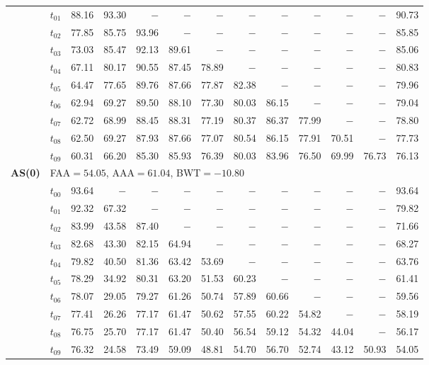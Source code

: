 \begin{table}[ht]
\begin{tabular}{@{}l l r r r r r r r r r r r@{}}
 & $t_{01}$ & 88.16 & 93.30 & $-$ & $-$ & $-$ & $-$ & $-$ & $-$ & $-$ & $-$ & 90.73 \\
 & $t_{02}$ & 77.85 & 85.75 & 93.96 & $-$ & $-$ & $-$ & $-$ & $-$ & $-$ & $-$ & 85.85 \\
 & $t_{03}$ & 73.03 & 85.47 & 92.13 & 89.61 & $-$ & $-$ & $-$ & $-$ & $-$ & $-$ & 85.06 \\
 & $t_{04}$ & 67.11 & 80.17 & 90.55 & 87.45 & 78.89 & $-$ & $-$ & $-$ & $-$ & $-$ & 80.83 \\
 & $t_{05}$ & 64.47 & 77.65 & 89.76 & 87.66 & 77.87 & 82.38 & $-$ & $-$ & $-$ & $-$ & 79.96 \\
 & $t_{06}$ & 62.94 & 69.27 & 89.50 & 88.10 & 77.30 & 80.03 & 86.15 & $-$ & $-$ & $-$ & 79.04 \\
 & $t_{07}$ & 62.72 & 68.99 & 88.45 & 88.31 & 77.19 & 80.37 & 86.37 & 77.99 & $-$ & $-$ & 78.80 \\
 & $t_{08}$ & 62.50 & 69.27 & 87.93 & 87.66 & 77.07 & 80.54 & 86.15 & 77.91 & 70.51 & $-$ & 77.73 \\
 & $t_{09}$ & 60.31 & 66.20 & 85.30 & 85.93 & 76.39 & 80.03 & 83.96 & 76.50 & 69.99 & 76.73 & 76.13 \\
\midrule
\multirow{11}{*}{\textbf{AS(0)}} & \multicolumn{12}{l}{\quad\small FAA$=54.05$,\; AAA$=61.04$,\; BWT$=-10.80$} \\
 & $t_{00}$ & 93.64 & $-$ & $-$ & $-$ & $-$ & $-$ & $-$ & $-$ & $-$ & $-$ & 93.64 \\
 & $t_{01}$ & 92.32 & 67.32 & $-$ & $-$ & $-$ & $-$ & $-$ & $-$ & $-$ & $-$ & 79.82 \\
 & $t_{02}$ & 83.99 & 43.58 & 87.40 & $-$ & $-$ & $-$ & $-$ & $-$ & $-$ & $-$ & 71.66 \\
 & $t_{03}$ & 82.68 & 43.30 & 82.15 & 64.94 & $-$ & $-$ & $-$ & $-$ & $-$ & $-$ & 68.27 \\
 & $t_{04}$ & 79.82 & 40.50 & 81.36 & 63.42 & 53.69 & $-$ & $-$ & $-$ & $-$ & $-$ & 63.76 \\
 & $t_{05}$ & 78.29 & 34.92 & 80.31 & 63.20 & 51.53 & 60.23 & $-$ & $-$ & $-$ & $-$ & 61.41 \\
 & $t_{06}$ & 78.07 & 29.05 & 79.27 & 61.26 & 50.74 & 57.89 & 60.66 & $-$ & $-$ & $-$ & 59.56 \\
 & $t_{07}$ & 77.41 & 26.26 & 77.17 & 61.47 & 50.62 & 57.55 & 60.22 & 54.82 & $-$ & $-$ & 58.19 \\
 & $t_{08}$ & 76.75 & 25.70 & 77.17 & 61.47 & 50.40 & 56.54 & 59.12 & 54.32 & 44.04 & $-$ & 56.17 \\
 & $t_{09}$ & 76.32 & 24.58 & 73.49 & 59.09 & 48.81 & 54.70 & 56.70 & 52.74 & 43.12 & 50.93 & 54.05 \\

\end{tabular}
\end{table}
